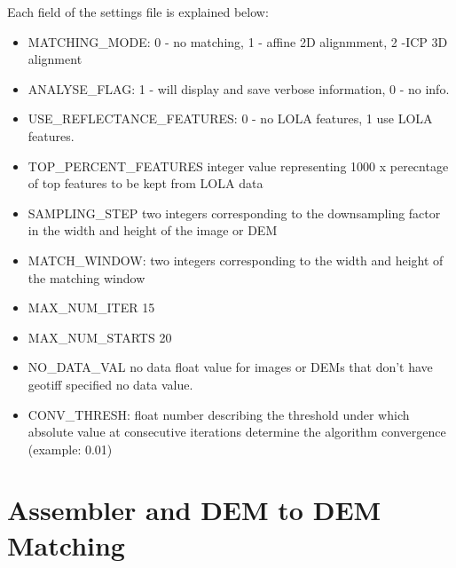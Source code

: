 \documentclass[12pt]{article}
\begin{document}
Each field of the settings file is explained below:
\begin{itemize}
\item{MATCHING\_MODE}: 0 - no matching, 1 - affine 2D alignmment, 2 -ICP 3D alignment\\
\item{ANALYSE\_FLAG}:  1 - will display and save verbose information, 0 - no info.\\
\item{USE\_REFLECTANCE\_FEATURES}: 0 - no LOLA features, 1 use LOLA features.\\ 
\item{TOP\_PERCENT\_FEATURES} integer value representing 1000 x perecntage of top features to be kept from LOLA data\\
\item{SAMPLING\_STEP} two integers corresponding to the downsampling factor in the width and height of the image or DEM\\
\item{MATCH\_WINDOW}: two integers corresponding to the width and height of the matching window\\
\item{MAX\_NUM\_ITER} 15\\
\item{MAX\_NUM\_STARTS} 20\\
\item{NO\_DATA\_VAL} no data float value for images or DEMs that don't have geotiff specified no data value.\\
\item{CONV\_THRESH}: float number describing the threshold under which absolute value at consecutive iterations determine 
                                the algorithm convergence (example: 0.01)\\
\end{itemize}


\section{Assembler and DEM to DEM Matching }
\label{sec:dem2dem}

\end{document}
